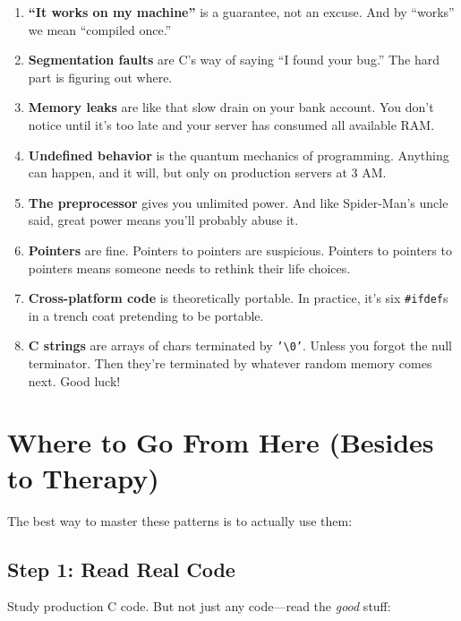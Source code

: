 \documentclass[10pt,openany]{book}
\begin{document}
\begin{enumerate}
    \item \textbf{``It works on my machine''} is a guarantee, not an excuse. And by ``works'' we mean ``compiled once.''

    \item \textbf{Segmentation faults} are C's way of saying ``I found your bug.'' The hard part is figuring out where.

    \item \textbf{Memory leaks} are like that slow drain on your bank account. You don't notice until it's too late and your server has consumed all available RAM.

    \item \textbf{Undefined behavior} is the quantum mechanics of programming. Anything can happen, and it will, but only on production servers at 3 AM.

    \item \textbf{The preprocessor} gives you unlimited power. And like Spider-Man's uncle said, great power means you'll probably abuse it.

    \item \textbf{Pointers} are fine. Pointers to pointers are suspicious. Pointers to pointers to pointers means someone needs to rethink their life choices.

    \item \textbf{Cross-platform code} is theoretically portable. In practice, it's six \texttt{\#ifdef}s in a trench coat pretending to be portable.

    \item \textbf{C strings} are arrays of chars terminated by \texttt{'\textbackslash 0'}. Unless you forgot the null terminator. Then they're terminated by whatever random memory comes next. Good luck!
\end{enumerate}

\section*{Where to Go From Here (Besides to Therapy)}

The best way to master these patterns is to actually use them:

\subsection*{Step 1: Read Real Code}

Study production C code. But not just any code---read the \textit{good} stuff:
\end{document}
